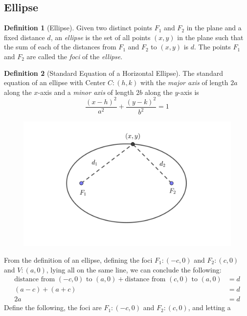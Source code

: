 \documentclass[a4paper]{article}
\theoremstyle{definition}
\newtheorem*{defi}{Definition}
\begin{document}
\subsection{Ellipse}
\begin{defi}[Ellipse]
     Given two distinct points $F_1$ and $F_2$ in the plane and a fixed distance
     $d$, an \emph{ellipse} is the set of all points $(x,y)$ in the plane such
     that the sum of each of the distances from $F_1$ and $F_2$ to $(x,y)$ is
     $d$. The points $F_1$ and $F_2$ are called the \emph{foci} of the
     \emph{ellipse}.
\end{defi}
\begin{defi}[Standard Equation of a Horizontal Ellipse]
     The standard equation of an ellipse with Center $C:(h,k)$ with the
      \emph{major axis} of length $2a$ along the $x$-axis  and a \emph{minor
      axis} of length $2b$ along the $y$-axis is
      \begin{equation*}
           \dfrac{(x-h)^2}{a^2}+\dfrac{(y-k)^2}{b^2}=1
      \end{equation*}
\end{defi}
\begin{figure}[h]
     \centering
     \includegraphics[scale = 2]{ellipse1.png}
\end{figure}
From the definition of an ellipse, defining the foci $F_1:(-c,0)$ and
 $F_2:(c,0)$ and $V:(a,0)$, lying all on the same line, we can conclude the
 following:
\begin{align*}
     \text{distance from $(-c,0)$ to $(a,0)$} + 
     \text{distance from $(c,0)$ to $(a,0)$} &= d \\[1.25ex]
     (a-c) + (a+c) &= d \\[1.25ex]
     2a &= d
\end{align*}
Define the following, the foci are $F_1:(-c,0)$ and $F_2:(c,0)$, and letting a
\end{document}
